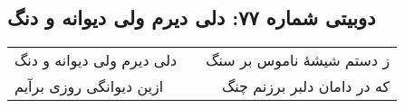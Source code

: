 \begin{center}
\section*{دوبیتی شماره ۷۷: دلی دیرم ولی دیوانه و دنگ}
\label{sec:077}
\begin{longtable}{l p{0.5cm} r}
دلی دیرم ولی دیوانه و دنگ
&&
ز دستم شیشهٔ ناموس بر سنگ
\\
ازین دیوانگی روزی برآیم
&&
که در دامان دلبر برزنم چنگ
\\
\end{longtable}
\end{center}
